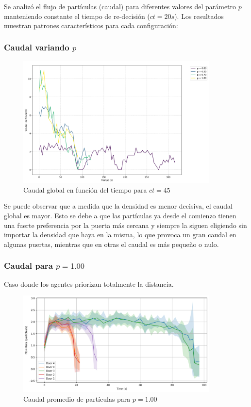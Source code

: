\documentclass[12pt]{article}
\begin{document}
Se analizó el flujo de partículas (caudal) para diferentes valores del parámetro $p$ manteniendo constante el tiempo de re-decisión ($ct=20s$). Los resultados muestran patrones característicos para cada configuración:

\subsubsection{Caudal variando $p$}

\begin{figure}[H]
    \centering
    \includegraphics[width=0.9\textwidth]{img/caudal_vs_time_t45.png}
    \caption{Caudal global en función del tiempo para $ct=45$}
    \label{fig:flow_p100}
\end{figure}
Se puede observar que a medida que la densidad es menor decisiva, el caudal global es mayor. Esto se debe a que las partículas ya desde el comienzo tienen una fuerte preferencia por la puerta más cercana y siempre la siguen eligiendo sin importar la densidad que haya en la misma, lo que provoca un gran caudal en algunas puertas, mientras que en otras el caudal es más pequeño o nulo.

\subsubsection{Caudal para $p = 1.00$}
Caso donde los agentes priorizan totalmente la distancia.

\begin{figure}[H]
    \centering
    \includegraphics[width=0.9\textwidth]{img/door_flow_rates_t_20_&_p_1.00.png}
    \caption{Caudal promedio de partículas para $p=1.00$}
    \label{fig:caudal_p100}
\end{figure}
\end{document}
